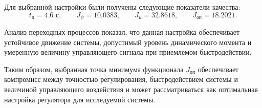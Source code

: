 Для выбранной настройки были получены следующие показатели качества:
\[
t_{\text{п}} = 4.6 \text{ с},
\qquad
J_{\psi} = 10.0383,
\qquad
J_u = 32.8618,
\qquad
J_{\text{оп}} = 18.2021.
\]

Анализ переходных процессов показал, что данная настройка обеспечивает устойчивое движение системы, допустимый уровень динамического момента и умеренную величину управляющего сигнала при приемлемом быстродействии.

Таким образом, выбранная точка минимума функционала \(J_{\text{оп}}\) обеспечивает компромисс между точностью регулирования, быстродействием системы и величиной управляющего воздействия и может рассматриваться как оптимальная настройка регулятора для исследуемой системы.
